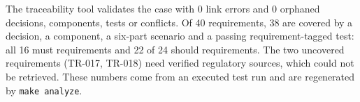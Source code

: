 The traceability tool validates the case with 0 link errors and 0 orphaned decisions, components, tests or conflicts. Of 40 requirements, 38 are covered by a decision, a component, a six-part scenario and a passing requirement-tagged test: all 16 must requirements and 22 of 24 should requirements. The two uncovered requirements (TR-017, TR-018) need verified regulatory sources, which could not be retrieved. These numbers come from an executed test run and are regenerated by \texttt{make analyze}.%
